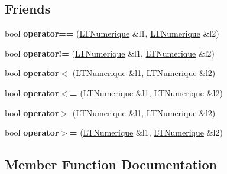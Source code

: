 \subsection*{Friends}
\begin{DoxyCompactItemize}
\item 
bool {\bfseries operator==} (\hyperlink{class_l_t_numerique}{L\+T\+Numerique} \&l1, \hyperlink{class_l_t_numerique}{L\+T\+Numerique} \&l2)\hypertarget{class_l_t_numerique_ae22deea9ec68fc9e4b3844ce3e2a17b1}{}\label{class_l_t_numerique_ae22deea9ec68fc9e4b3844ce3e2a17b1}

\item 
bool {\bfseries operator!=} (\hyperlink{class_l_t_numerique}{L\+T\+Numerique} \&l1, \hyperlink{class_l_t_numerique}{L\+T\+Numerique} \&l2)\hypertarget{class_l_t_numerique_ac270ee2118c09d7357f163556710fe2a}{}\label{class_l_t_numerique_ac270ee2118c09d7357f163556710fe2a}

\item 
bool {\bfseries operator$<$} (\hyperlink{class_l_t_numerique}{L\+T\+Numerique} \&l1, \hyperlink{class_l_t_numerique}{L\+T\+Numerique} \&l2)\hypertarget{class_l_t_numerique_aff65692b26bbb7ecb049394d05de5e73}{}\label{class_l_t_numerique_aff65692b26bbb7ecb049394d05de5e73}

\item 
bool {\bfseries operator$<$=} (\hyperlink{class_l_t_numerique}{L\+T\+Numerique} \&l1, \hyperlink{class_l_t_numerique}{L\+T\+Numerique} \&l2)\hypertarget{class_l_t_numerique_aec3955c88443d36f9e378c47a1990058}{}\label{class_l_t_numerique_aec3955c88443d36f9e378c47a1990058}

\item 
bool {\bfseries operator$>$} (\hyperlink{class_l_t_numerique}{L\+T\+Numerique} \&l1, \hyperlink{class_l_t_numerique}{L\+T\+Numerique} \&l2)\hypertarget{class_l_t_numerique_a500bab8b4205a5a0b43a1760734b4b21}{}\label{class_l_t_numerique_a500bab8b4205a5a0b43a1760734b4b21}

\item 
bool {\bfseries operator$>$=} (\hyperlink{class_l_t_numerique}{L\+T\+Numerique} \&l1, \hyperlink{class_l_t_numerique}{L\+T\+Numerique} \&l2)\hypertarget{class_l_t_numerique_a5ed128e9026bda1a4529d31368e0aa1b}{}\label{class_l_t_numerique_a5ed128e9026bda1a4529d31368e0aa1b}

\end{DoxyCompactItemize}


\subsection{Member Function Documentation}
